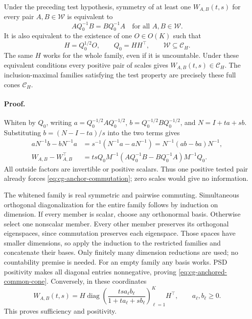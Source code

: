 Under the preceding test hypothesis, symmetry of at least one
\(W_{A,B}(t,s)\) for every pair \(A,B\in\mathscr W\) is equivalent to
\begin{equation}
AQ_0^{-1}B=BQ_0^{-1}A
\quad\text{for all }A,B\in\mathscr W.
\label{eq:cg-anchor-commutation}
\end{equation}
It is also equivalent to the existence of one \(O\in O(K)\) such that
\begin{equation}
H=Q_0^{1/2}O,\qquad Q_0=HH^\top,\qquad
\mathscr W\subseteq\mathcal C_H.
\label{eq:cg-anchored-common-cone}
\end{equation}
The same \(H\) works for the whole family, even if it is uncountable.
Under these equivalent conditions every positive pair of scales gives
\(W_{A,B}(t,s)\in\mathcal C_H\). The inclusion-maximal families satisfying
the test property are precisely these full cones \(\mathcal C_H\).

\paragraph{Proof.}
Whiten by \(Q_0\), writing
\(a=Q_0^{-1/2}AQ_0^{-1/2}\),
\(b=Q_0^{-1/2}BQ_0^{-1/2}\), and \(N=I+ta+sb\).
Substituting \(b=(N-I-ta)/s\) into the two terms gives
\begin{equation}
\begin{aligned}
aN^{-1}b-bN^{-1}a
 &=s^{-1}(N^{-1}a-aN^{-1})
  =N^{-1}(ab-ba)N^{-1},\\
W_{A,B}-W_{A,B}^\top
 &=tsQ_0M^{-1}(AQ_0^{-1}B-BQ_0^{-1}A)M^{-1}Q_0.
\end{aligned}
\label{eq:cg-exact-pair-antisymmetry}
\end{equation}
All outside factors are invertible or positive scalars. Thus one positive
tested pair already forces \eqref{eq:cg-anchor-commutation}; zero scales
would give no information.

The whitened family is real symmetric and pairwise commuting. Simultaneous
orthogonal diagonalization for the entire family follows by induction on
dimension. If every member is scalar, choose any orthonormal basis.
Otherwise select one nonscalar member. Every other member preserves its
orthogonal eigenspaces, since commutation preserves each eigenspace.
Those spaces have smaller dimensions, so apply the induction to the
restricted families and concatenate their bases. Only finitely many
dimension reductions are used; no countability premise is needed.
For an empty family any basis works. PSD positivity makes all diagonal
entries nonnegative, proving \eqref{eq:cg-anchored-common-cone}.
Conversely, in these coordinates
\begin{equation}
W_{A,B}(t,s)=
H\operatorname{diag}\left(
\frac{ts a_\ell b_\ell}{1+ta_\ell+sb_\ell}
\right)_{\ell=1}^K H^\top,
\qquad a_\ell,b_\ell\geq0.
\label{eq:cg-independent-diagonal-output}
\end{equation}
This proves sufficiency and positivity.

